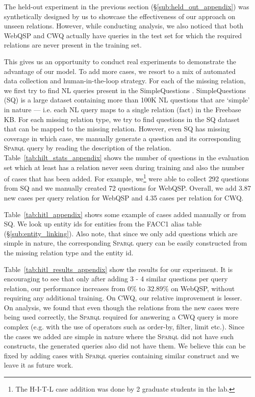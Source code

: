 \documentclass{article}
\newcommand{\spql}{\textsc{Sparql}\xspace}
\begin{document}
The held-out experiment in the previous section (\S\ref{sub:held_out_appendix}) was synthetically designed by us to showcase the effectiveness of our approach on unseen relations. However, while conducting analysis, we also noticed that both WebQSP and CWQ actually have queries in the test set for which the required relations are never present in the training set. 

This gives us an opportunity to conduct real experiments to demonstrate the advantage of our model. To add more cases, we resort to a mix of automated data collection and human-in-the-loop strategy. For each of the missing relation, we first try to find NL queries present in the SimpleQuestions \cite{bordes2015large}. SimpleQuestions (SQ) is a large dataset containing more than 100K NL questions that are `simple' in nature --- i.e. each NL query maps to a single relation (fact) in the Freebase KB.  For each missing relation type, we try to find questions in the SQ dataset that can be mapped to the missing relation. However, even SQ has missing coverage in which case, we manually generate a question and its corresponding \spql query by reading the description of the relation. Table~\ref{tab:hilt_stats_appendix} shows the number of questions in the evaluation set which at least has a relation never seen during training and also the number of cases that has been added. For example, we\footnote{The H-I-T-L case addition was done by 2 graduate students in the lab. } were able to collect 292 questions from SQ and we manually created 72 questions for WebQSP. Overall, we add 3.87 new cases per query relation for WebQSP and 4.35 cases per relation for CWQ.

Table~\ref{tab:hitl_appendix} shows some example of cases added manually or from SQ. We look up entity ids for entities from the FACC1 alias table (\S\ref{sub:entity_linking}). Also note, that since we only add questions which are simple in nature, the corresponding \spql query can be easily constructed from the missing relation type and the entity id. 

Table~\ref{tab:hitl_results_appendix} show the results for our experiment. It is encouraging to see that only after adding 3 - 4 similar questions per query relation, our performance increases from 0\% to 32.89\% on WebQSP, without requiring any additional training. On CWQ, our relative improvement is lesser. On analysis, we found that even though the relations from the new cases were being used correctly, the \spql required for answering a CWQ query is more complex (e.g. with the use of operators such as order-by, filter, limit etc.). Since the cases we added are simple in nature where the \spql did not have such constructs, the generated queries also did not have them. We believe this can be fixed by adding cases with \spql queries containing similar construct and we leave it as future work.
\end{document}
